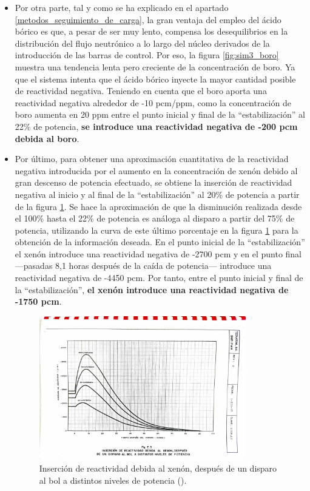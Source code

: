 \begin{itemize}
  \vspace{-0.4cm}
  \item Por otra parte, tal y como se ha explicado en el apartado \ref{metodos_seguimiento_de_carga}, la gran ventaja del empleo del ácido bórico es que, a pesar de ser muy lento, compensa los desequilibrios en la distribución del flujo neutrónico a lo largo del núcleo derivados de la introducción de las barras de control. Por eso, la figura \ref{fig:sim3_boro} muestra una tendencia lenta pero creciente de la concentración de boro. Ya que el sistema intenta que el ácido bórico inyecte la mayor cantidad posible de reactividad negativa. Teniendo en cuenta que el boro aporta una reactividad negativa alrededor de -10 pcm/ppm, como la concentración de boro aumenta en 20 ppm entre el punto inicial y final de la ``estabilización'' al 22\% de potencia, \textbf{se introduce una reactividad negativa de -200 pcm debida al boro}.
  
  \item Por último, para obtener una aproximación cuantitativa de la reactividad negativa introducida por el aumento en la concentración de xenón debido al gran descenso de potencia efectuado, se obtiene la inserción de reactividad negativa al inicio y al final de la ``estabilización'' al 20\% de potencia a partir de la figura \ref{fig:reactividad_xenon_disparo}. Se hace la aproximación de que la disminución realizada desde el 100\% hasta el 22\% de potencia es análoga al disparo a partir del 75\% de potencia, utilizando la curva de este último porcentaje en la figura \ref{fig:reactividad_xenon_disparo} para la obtención de la información deseada. En el punto inicial de la ``estabilización'' el xenón introduce una reactividad negativa de -2700 pcm y en el punto final ---pasadas 8,1 horas después de la caída de potencia--- introduce una reactividad negativa de -4450 pcm. Por tanto, entre el punto inicial y final de la ``estabilización'', \textbf{el xenón introduce una reactividad negativa de -1750 pcm}.
  
  \begin{figure}[!h]
    \centering
    \includegraphics[width=0.85\textwidth]{content/figures/reactividad_xenon_disparo.pdf}
    \caption{Inserción de reactividad debida al xenón, después de un disparo al \acrshort{bol} a distintos niveles de potencia (\cite{documentacion_sgiz}).}
    \label{fig:reactividad_xenon_disparo}
  \end{figure}


\end{itemize}
